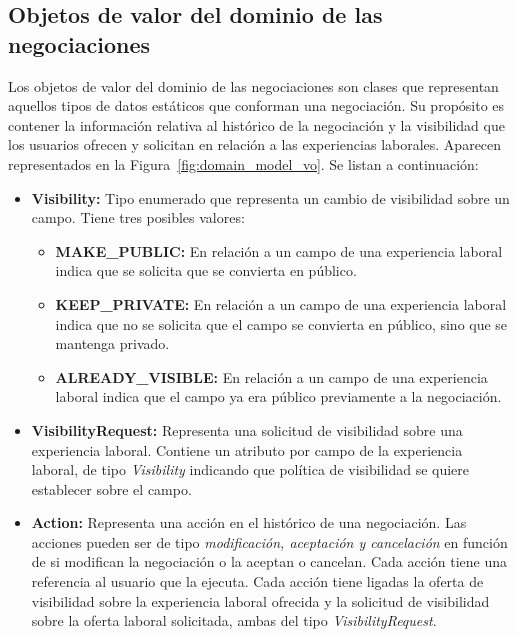 \documentclass[a4paper, 12pt]{book}
\begin{document}
    \subsection{Objetos de valor del dominio de las negociaciones}
    \label{subsec:negotiation_value_objects}
    Los objetos de valor del dominio de las negociaciones son clases que representan aquellos tipos de datos estáticos que conforman una negociación.
    Su propósito es contener la información relativa al histórico de la negociación y la visibilidad que los usuarios ofrecen y solicitan en relación a las experiencias laborales.
    Aparecen representados en la Figura~\ref{fig:domain_model_vo}.
    Se listan a continuación:

    \begin{itemize}
        \item \textbf{Visibility:} Tipo enumerado que representa un cambio de visibilidad sobre un campo. Tiene tres posibles valores:
        \begin{itemize}
            \item \textbf{MAKE\_PUBLIC:} En relación a un campo de una experiencia laboral indica que se solicita que se convierta en público.
            \item \textbf{KEEP\_PRIVATE:} En relación a un campo de una experiencia laboral indica que no se solicita que el campo se convierta en público, sino que se mantenga privado.
            \item \textbf{ALREADY\_VISIBLE:} En relación a un campo de una experiencia laboral indica que el campo ya era público previamente a la negociación.
        \end{itemize}
        \item \textbf{VisibilityRequest:} Representa una solicitud de visibilidad sobre una experiencia laboral. Contiene un atributo por campo de la experiencia laboral, de tipo \emph{Visibility} indicando que política de visibilidad se quiere establecer sobre el campo.
        \item \textbf{Action:} Representa una acción en el histórico de una negociación. Las acciones pueden ser de tipo \emph{modificación, aceptación y cancelación} en función de si modifican la negociación o la aceptan o cancelan.
        Cada acción tiene una referencia al usuario que la ejecuta.
        Cada acción tiene ligadas la oferta de visibilidad sobre la experiencia laboral ofrecida y la solicitud de visibilidad sobre la oferta laboral solicitada, ambas del tipo \emph{VisibilityRequest}.
    \end{itemize}
\end{document}
